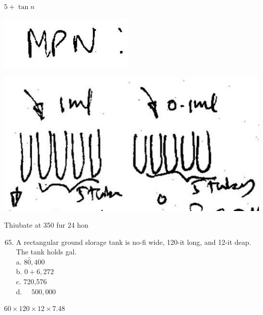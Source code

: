 \documentclass[10pt]{article}
\begin{document}
$5+\tan n$

\includegraphics[max width=\textwidth]{2022_11_11_ca6a6c1a0324ee23e523g-11(1)}

\includegraphics[max width=\textwidth]{2022_11_11_ca6a6c1a0324ee23e523g-11(2)}

Thiubate at 350 fur 24 hon

\begin{enumerate}
  \setcounter{enumi}{64}
  \item A rectangular ground slorage tank is no-fi wide, 120-it long, and 12-it deap. The tank holds gal.\\
a. $8 \hat{0}, 400$\\
b. $0+6,272$\\
c. 720,576\\
d. $\quad 500,000$
\end{enumerate}

$60 \times 120 \times 12 \times 7.48$
\end{document}
